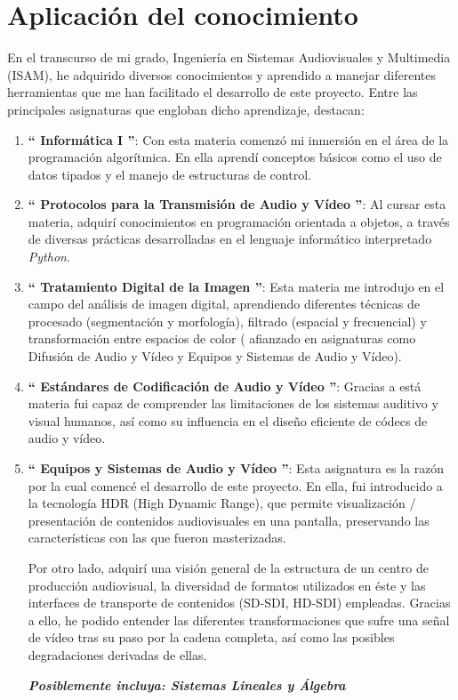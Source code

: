\documentclass[a4paper, 12pt]{report}
\begin{document}
\section{Aplicación del conocimiento}
\label{sec:aplicacion}
En el transcurso de mi grado, Ingeniería en Sistemas Audiovisuales y Multimedia (ISAM), he adquirido diversos conocimientos y  aprendido a manejar diferentes herramientas que me han facilitado el desarrollo de este proyecto. Entre las principales asignaturas que engloban dicho aprendizaje, destacan:
\begin{enumerate}
  \item \textbf{`` Informática I ''}: Con esta materia comenzó mi inmersión en el área de la programación algorítmica. En ella aprendí conceptos básicos como el uso de datos tipados y  el manejo de estructuras de control.
  
  \item \textbf{`` Protocolos para la Transmisión de Audio y Vídeo ''}: Al cursar esta materia, adquirí conocimientos en programación orientada a objetos, a través de diversas prácticas desarrolladas en el lenguaje informático interpretado \textit{Python}.
  
  \item \textbf{`` Tratamiento Digital de la Imagen ''}: Esta materia me introdujo en el campo del análisis de imagen digital, aprendiendo diferentes técnicas de procesado (segmentación y morfología), filtrado (espacial y frecuencial) y transformación entre espacios de color ( afianzado en asignaturas como Difusión de Audio y Vídeo y Equipos y Sistemas de Audio y Vídeo).
  
  \item \textbf{`` Estándares de Codificación de Audio y Vídeo ''}: Gracias a está materia fui capaz de comprender las limitaciones de los sistemas auditivo y visual humanos, así como su influencia en el diseño eficiente de códecs de audio y vídeo.
  
  \item \textbf{`` Equipos y Sistemas de Audio y Vídeo ''}: Esta asignatura es la razón por la cual comencé el desarrollo de este proyecto. En ella, fui introducido a la tecnología HDR (High Dynamic Range), que permite visualización / presentación  de contenidos audiovisuales en una pantalla, preservando las características con las que fueron masterizadas.  

 Por otro lado, adquirí una visión general de la estructura de un centro de producción audiovisual, la diversidad de formatos utilizados en éste y las interfaces de transporte de contenidos (SD-SDI, HD-SDI) empleadas. Gracias a ello, he podido entender las diferentes transformaciones que sufre una señal de vídeo tras su paso por la cadena completa, así como las posibles degradaciones derivadas de ellas.
 
 \textbf{\textit{Posiblemente incluya: Sistemas Lineales y Álgebra}}
\end{enumerate}
\end{document}
